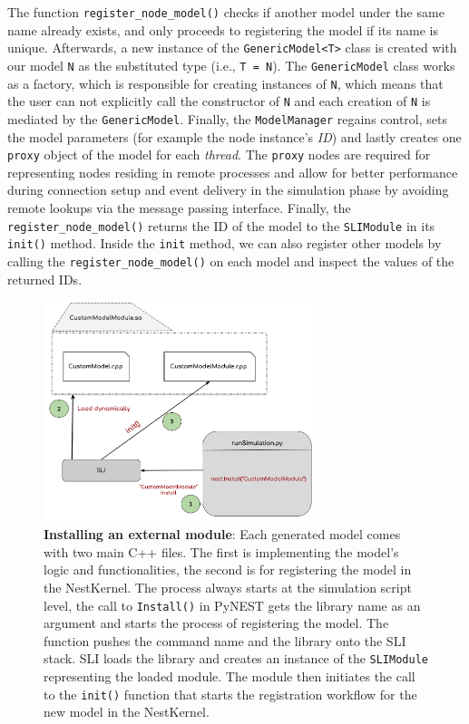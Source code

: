 The function \texttt{register\_node\_model()} checks if another model under the same name already exists, and only proceeds to registering the model if its name is unique. Afterwards, a new instance of the \texttt{GenericModel<T>} class is created with our model \texttt{N} as the substituted type (i.e., \texttt{T = N}). The \texttt{GenericModel} class works as a factory, which is responsible for creating instances of \texttt{N}, which means that the user can not explicitly call the constructor of \texttt{N} and each creation of \texttt{N} is mediated by the \texttt{GenericModel}. Finally, the \texttt{ModelManager} regains control, sets the model parameters (for example the node instance's \emph{ID}) and lastly creates one \texttt{proxy} object of the model for each \emph{thread}. The \texttt{proxy} nodes are required for representing nodes residing in remote processes and allow for better performance during connection setup and event delivery in the simulation phase by avoiding remote lookups via the message passing interface. Finally, the \texttt{register\_node\_model()} returns the ID of the model to the \texttt{SLIModule} in its \texttt{init()} method. Inside the \texttt{init} method, we can also register other models by calling the \texttt{register\_node\_model()} on each model and inspect the values of the returned IDs.

\begin{figure}[ht!]
\centering
\includegraphics[width=0.7\textwidth]{src/pic/install_command.png}
\caption{\textbf{Installing an external module}: Each generated model comes with two main C++ files. The first is implementing the model's logic and functionalities, the second is for registering the model in the NestKernel. The process always starts at the simulation script level, the call to \texttt{Install()} in PyNEST gets the library name as an argument and starts the process of registering the model. The function pushes the command name and the library onto the SLI stack. SLI loads the library and creates an instance of the \texttt{SLIModule} representing the loaded module. The module then initiates the call to the \texttt{init()} function that starts the registration workflow for the new model in the NestKernel.}
\label{fig:sli_install}
\end{figure}


